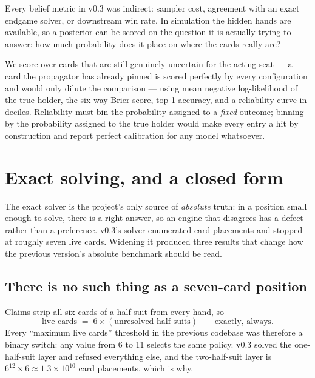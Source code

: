 \documentclass[11pt,letterpaper]{article}
\begin{document}
Every belief metric in v0.3 was indirect: sampler cost, agreement with an exact
endgame solver, or downstream win rate. In simulation the hidden hands are
available, so a posterior can be scored on the question it is actually trying
to answer: how much probability does it place on where the cards really are?

We score over cards that are still genuinely uncertain for the acting seat --- a
card the propagator has already pinned is scored perfectly by every
configuration and would only dilute the comparison --- using mean negative
log-likelihood of the true holder, the six-way Brier score, top-1 accuracy, and
a reliability curve in deciles. Reliability must bin the probability assigned
to a \emph{fixed} outcome; binning by the probability assigned to the true
holder would make every entry a hit by construction and report perfect
calibration for any model whatsoever.

\section{Exact solving, and a closed form}
\label{sec:exact}

The exact solver is the project's only source of \emph{absolute} truth: in a
position small enough to solve, there is a right answer, so an engine that
disagrees has a defect rather than a preference. v0.3's solver enumerated card
placements and stopped at roughly seven live cards. Widening it produced three
results that change how the previous version's absolute benchmark should be
read.

\subsection{There is no such thing as a seven-card position}

Claims strip all six cards of a half-suit from every hand, so
\begin{equation}
\text{live cards} \;=\; 6 \times (\text{unresolved half-suits}) \qquad
\text{exactly, always.}
\end{equation}
Every ``maximum live cards'' threshold in the previous codebase was therefore a
binary switch: any value from 6 to 11 selects the same policy. v0.3 solved the
one-half-suit layer and refused everything else, and the two-half-suit layer is
$6^{12}\times 6 \approx 1.3\times10^{10}$ card placements, which is why.
\end{document}
